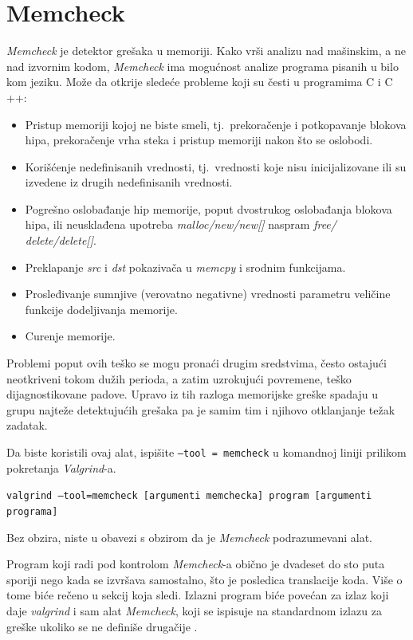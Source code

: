 \documentclass[12pt,oneside]{memoir}
\theoremstyle{plain}
\theoremstyle{definition}
\begin{document}
\section{Memcheck}
\textit{Memcheck} je detektor grešaka u memoriji. Kako vrši analizu nad mašinskim, a ne nad izvornim kodom, \textit{Memcheck} ima mogućnost analize programa pisanih u bilo kom jeziku. Može da otkrije sledeće probleme koji su česti u programima C i C ++:
\begin{itemize}
\item Pristup memoriji kojoj ne biste smeli, tj.~prekoračenje i potkopavanje blokova hipa, prekoračenje vrha steka i pristup memoriji nakon što se oslobodi.
\item Korišćenje nedefinisanih vrednosti, tj.~vrednosti koje nisu inicijalizovane ili su izvedene iz drugih nedefinisanih vrednosti.
\item Pogrešno oslobađanje hip memorije, poput dvostrukog oslobađanja blokova hipa, ili neusklađena upotreba \textit{malloc/new/new[]} naspram \textit{free/ delete/delete[]}.
\item Preklapanje \textit{src} i \textit{dst} pokazivača u \textit{memcpy} i srodnim funkcijama.
\item Prosleđivanje sumnjive (verovatno negativne) vrednosti parametru veličine funkcije dodeljivanja memorije.
\item Curenje memorije.
\end{itemize}

Problemi poput ovih teško se mogu pronaći drugim sredstvima, često ostajući neotkriveni tokom dužih perioda, a zatim uzrokujući povremene, teško dijagnostikovane padove. Upravo iz tih razloga memorijske greške spadaju u grupu najteže detektujućih grešaka pa je samim tim i njihovo otklanjanje težak zadatak.

Da biste koristili ovaj alat, ispišite \texttt{--tool = memcheck} u komandnoj liniji prilikom pokretanja \textit{Valgrind}-a.
 \begin{center}
\texttt{valgrind –tool=memcheck [argumenti memchecka] program [argumenti programa]}
\end{center}
Bez obzira, niste u obavezi s obzirom da je \textit{Memcheck} podrazumevani alat.

Program koji radi pod kontrolom \textit{Memcheck}-a obično je dvadeset do sto puta sporiji nego kada se izvršava samostalno, što je posledica translacije koda. Više o tome biće rečeno u sekcij koja sledi. Izlazni program biće povećan za izlaz koji daje \textit{valgrind} i sam alat \textit{Memcheck}, koji se ispisuje na standardnom izlazu za greške ukoliko se ne definiše drugačije \cite{Memcheck}. 
\end{document}
